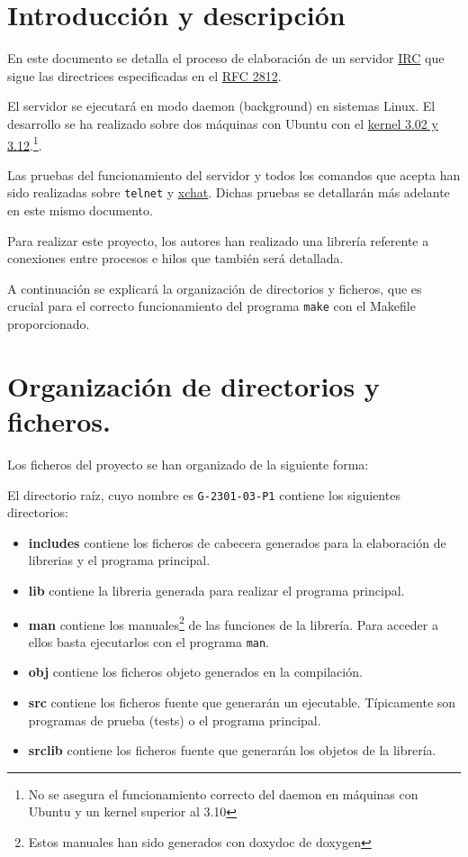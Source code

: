 \documentclass{mathnotes}
\title{\thetitle}
\author{\theauthor}
\date{Curso 2013 - 2014\\Universidad Autónoma de Madrid}
\begin{document}
\section{Introducción y descripción}
En este documento se detalla el proceso de elaboración de un servidor \href{http://es.wikipedia.org/wiki/Internet_Relay_Chat}{IRC} que sigue las directrices especificadas en el \href{https://tools.ietf.org/html/rfc2812}{RFC 2812}.

El servidor se ejecutará en modo daemon (background) en sistemas Linux. El desarrollo se ha realizado sobre dos máquinas con Ubuntu con el  \href{https://wiki.ubuntu.com/Kernel/Release} {kernel 3.02 y 3.12}.\footnote{No se asegura el funcionamiento correcto del daemon en máquinas con Ubuntu y un kernel superior al 3.10}.

Las pruebas del funcionamiento del servidor y todos los comandos que acepta han sido realizadas sobre \texttt{telnet} y \href{http://xchat.org/}{xchat}. Dichas pruebas se detallarán más adelante en este mismo documento.

Para realizar este proyecto, los autores han realizado una librería referente a conexiones entre procesos e hilos que también será detallada.

A continuación se explicará la organización de directorios y ficheros, que es crucial para el correcto funcionamiento del programa \texttt{make} con el Makefile proporcionado. 

\section{Organización de directorios y ficheros.}
Los ficheros del proyecto se han organizado de la siguiente forma:

El directorio raíz, cuyo nombre es \texttt{G-2301-03-P1} contiene los siguientes directorios:

\begin{itemize}
\item \textbf{includes} contiene los ficheros de cabecera generados para la elaboración de librerias y el programa principal.

\item \textbf{lib} contiene la libreria generada para realizar el programa principal.

\item \textbf{man} contiene los manuales\footnote{Estos manuales han sido generados con doxydoc de doxygen} de las funciones de la librería. Para acceder a ellos basta ejecutarlos con el programa \texttt{man}.

\item \textbf{obj} contiene los ficheros objeto generados en la compilación.

\item \textbf{src} contiene los ficheros fuente que generarán un ejecutable. Típicamente son programas de prueba (tests) o el programa principal.

\item \textbf{srclib} contiene los ficheros fuente que generarán los objetos de la librería.
\end{itemize}
\end{document}
